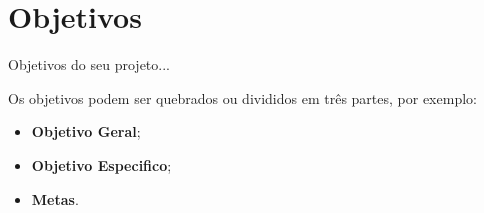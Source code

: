 
\section{Objetivos}
\label{s_objetivos}
Objetivos do seu projeto...

Os objetivos podem ser quebrados ou divididos em três partes, por exemplo:

\begin{itemize}
\item \textbf{Objetivo Geral};
\item \textbf{Objetivo Especifico};
\item \textbf{Metas}.
\end{itemize}
